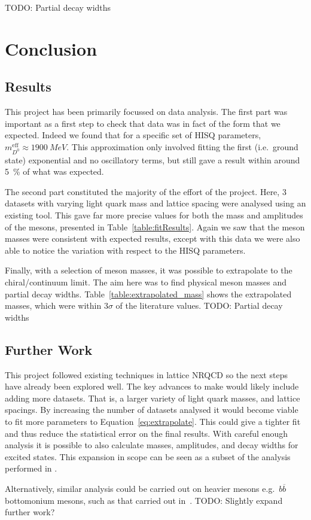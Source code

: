 \documentclass[a4paper,12pt]{article}
\begin{document}
TODO: Partial decay widths

\section{Conclusion}
\subsection{Results}
This project has been primarily focussed on data analysis. The first part was important as a first step to check that data was in fact of the form that we expected. Indeed we found that for a specific set of HISQ parameters, $m^\mathrm{eff}_{D^0}\approx \SI{1900}{MeV}$. This approximation only involved fitting the first (i.e.\ ground state) exponential and no oscillatory terms, but still gave a result within around \SI{5}{\%} of what was expected.

The second part constituted the majority of the effort of the project. Here, 3 datasets with varying light quark mass and lattice spacing were analysed using an existing tool. This gave far more precise values for both the mass and amplitudes of the mesons, presented in Table~\ref{table:fitResults}. Again we saw that the meson masses were consistent with expected results, except with this data we were also able to notice the variation with respect to the HISQ parameters.

Finally, with a selection of meson masses, it was possible to extrapolate to the chiral/continuum limit. The aim here was to find physical meson masses and partial decay widths. Table~\ref{table:extrapolated_mass} shows the extrapolated masses, which were within $3\sigma$ of the literature values. TODO: Partial decay widths

\subsection{Further Work}
This project followed existing techniques in lattice NRQCD so the next steps have already been explored well. The key advances to make would likely include adding more datasets. That is, a larger variety of light quark masses, and lattice spacings. By increasing the number of datasets analysed it would become viable to fit more parameters to Equation~\ref{eq:extrapolate}. This could give a tighter fit and thus reduce the statistical error on the final results. With careful enough analysis it is possible to also calculate masses, amplitudes, and decay widths for excited states. This expansion in scope can be seen as a subset of the analysis performed in \cite{chakraborty2021improved}.

Alternatively, similar analysis could be carried out on heavier mesons e.g.\ $b\overline{b}$ bottomonium mesons, such as that carried out in~\cite{parrott2020towards}. 
TODO: Slightly expand further work?

\printbibliography{}
\end{document}
